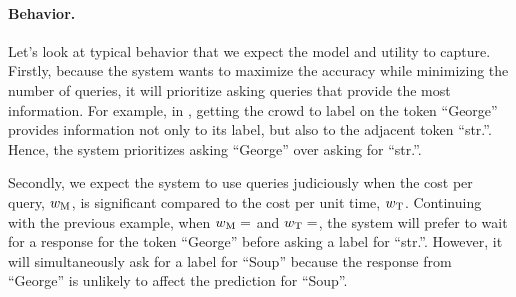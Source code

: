 
\paragraph{Behavior.}
Let's look at typical behavior that we expect the model and utility to capture.
Firstly, because the system wants to maximize the accuracy while minimizing the number of queries, it will prioritize asking queries that provide the most information.
For example,
in , getting the crowd to label on the token ``George'' provides information not only to its label, but also to the adjacent token ``str.''. Hence, the system prioritizes asking ``George'' over asking for ``str.''. 


Secondly, we expect the system to use queries judiciously when the cost per query, $w_\text{M}$, is significant compared to the cost per unit time, $w_\text{T}$.
Continuing with the previous example, when $w_\text{M} = $ and $w_\text{T} = $, the system will prefer to wait for a response for the token ``George'' before asking a label for ``str.''.
However, it will simultaneously ask for a label for ``Soup'' because the response from ``George'' is unlikely to affect the prediction for ``Soup''.


